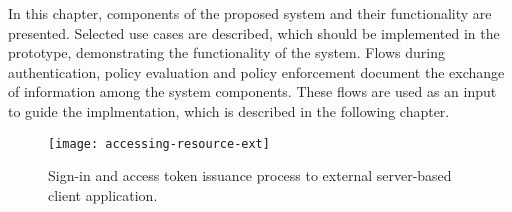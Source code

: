 \bigskip\noindent
In this chapter, components of the proposed system and their functionality are presented. Selected use cases are described, which should be implemented in the prototype, demonstrating the functionality of the system. Flows during authentication, policy evaluation and policy enforcement document the exchange of information among the system components. These flows are used as an input to guide the implmentation, which is described in the following chapter.

\begin{sidewaysfigure}[p]
    \centering
    \texttt{[image: accessing-resource-ext]}
    \caption{Sign-in and access token issuance process to external server-based client application.}
    \label{fig:accessing-resource-ext}
\end{sidewaysfigure}
\restoregeometry